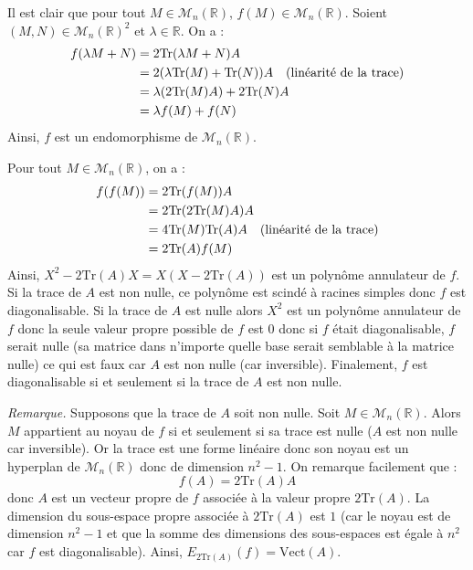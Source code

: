 \documentclass[a4paper,10pt]{report}
\begin{document}
\corr Il est clair que pour tout $M \in \mathcal{M}_n(\mathbb{R})$, $f(M) \in \mathcal{M}_n(\mathbb{R})$. Soient $(M,N) \in \mathcal{M}_n(\mathbb{R})^2$ et $\lambda \in \mathbb{R}$. On a :
\begin{align*}
f(\lambda M + N) & = 2 \textrm{Tr}(\lambda M + N) A \\
& = 2 (\lambda \textrm{Tr}(M) +  \textrm{Tr}(N))A \quad \hbox{(linéarité de la trace)} \\
& =\lambda (2 \textrm{Tr}(M)A) + 2 \textrm{Tr}(N)A \\
&= \lambda f(M) + f(N)
\end{align*}
Ainsi, $f$ est un endomorphisme de $\mathcal{M}_n(\mathbb{R})$.

\medskip
%

\noindent Pour tout $M \in \mathcal{M}_n(\mathbb{R})$, on a :
\begin{align*}
f(f(M)) & =  2\textrm{Tr}(f(M)) A \\
& = 2\textrm{Tr}(2\textrm{Tr}(M) A) A \\
& = 4 \textrm{Tr}(M) \textrm{Tr}(A) A \quad \hbox{(linéarité de la trace)} \\
& = 2 \textrm{Tr}(A) f(M)
\end{align*}
Ainsi, $X^2-2\textrm{Tr}(A)X= X(X- 2 \textrm{Tr}(A))$ est un polynôme annulateur de $f$. Si la trace de $A$ est non nulle, ce polynôme est scindé à racines simples donc $f$ est diagonalisable. Si la trace de $A$ est nulle alors $X^2$ est un polynôme annulateur de $f$ donc la seule valeur propre possible de $f$ est $0$ donc si $f$ était diagonalisable, $f$ serait nulle (sa matrice dans n'importe quelle base serait semblable à la matrice nulle) ce qui est faux car $A$ est non nulle (car inversible). Finalement, $f$ est diagonalisable si et seulement si la trace de $A$ est non nulle.

\medskip

\noindent \textit{Remarque.} Supposons que la trace de $A$ soit non nulle. Soit $M \in \mathcal{M}_n(\mathbb{R})$. Alors $M$ appartient au noyau de $f$ si et seulement si sa trace est nulle ($A$ est non nulle car inversible). Or la trace est une forme linéaire donc son noyau est un hyperplan de $\mathcal{M}_n(\mathbb{R})$ donc de dimension $n^2-1$. On remarque facilement que :
$$ f(A) = 2 \textrm{Tr}(A) A$$
donc $A$ est un vecteur propre de $f$ associée à la valeur propre $2 \textrm{Tr}(A)$. La dimension du sous-espace propre associée à $2 \textrm{Tr}(A)$ est $1$ (car le noyau est de dimension $n^2-1$ et que la somme des dimensions des sous-espaces est égale à $n^2$ car $f$ est diagonalisable). Ainsi, $E_{2\textrm{Tr}(A)}(f) = \textrm{Vect}(A)$.
\end{document}
